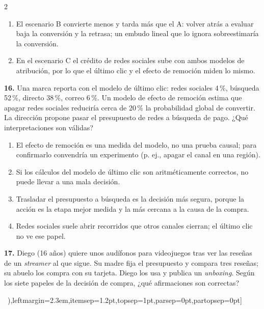 \documentclass[10pt,letterpaper]{article}
\newcommand{\cas}{\framebox[1.0em]{\rule{0pt}{1.05ex}}}
\begin{document}
\begin{multicols}{2}
\begin{minipage}[t]{\columnwidth}
\begin{enumerate}[label=\cas\ \alph*),leftmargin=2.3em,itemsep=1.2pt,topsep=1pt,parsep=0pt,partopsep=0pt]
\item El escenario B convierte menos y tarda más que el A: volver atrás a evaluar baja la conversión y la retrasa; un embudo lineal que lo ignora sobreestimaría la conversión.
\item En el escenario C el crédito de redes sociales sube con ambos modelos de atribución, por lo que el último clic y el efecto de remoción miden lo mismo.
\end{enumerate}\end{minipage}\par\vspace{3pt}
\begin{minipage}[t]{\columnwidth}\noindent\textbf{16.} Una marca reporta con el modelo de último clic: redes sociales 4\,\%, búsqueda 52\,\%, directo 38\,\%, correo 6\,\%. Un modelo de efecto de remoción estima que apagar redes sociales reduciría cerca de 20\,\% la probabilidad global de convertir. La dirección propone pasar el presupuesto de redes a búsqueda de pago. ¿Qué interpretaciones son válidas?
\vspace{1pt}\begin{enumerate}[label=\cas\ \alph*),leftmargin=2.3em,itemsep=1.2pt,topsep=1pt,parsep=0pt,partopsep=0pt]
\item El efecto de remoción es una medida del modelo, no una prueba causal; para confirmarlo convendría un experimento (p. ej., apagar el canal en una región).
\item Si los cálculos del modelo de último clic son aritméticamente correctos, no puede llevar a una mala decisión.
\item Trasladar el presupuesto a búsqueda es la decisión más segura, porque la acción es la etapa mejor medida y la más cercana a la causa de la compra.
\item Redes sociales suele abrir recorridos que otros canales cierran; el último clic no ve ese papel.
\end{enumerate}\end{minipage}\par\vspace{3pt}
\begin{minipage}[t]{\columnwidth}\noindent\textbf{17.} Diego (16 años) quiere unos audífonos para videojuegos tras ver las reseñas de un \textit{streamer} al que sigue. Su madre fija el presupuesto y compara tres reseñas; su abuelo los compra con su tarjeta. Diego los usa y publica un \textit{unboxing}. Según los siete papeles de la decisión de compra, ¿qué afirmaciones son correctas?
\vspace{1pt}\begin{enumerate}[label=\cas\ \alph*),leftmargin=2.3em,itemsep=1.2pt,topsep=1pt,parsep=0pt,partopsep=0pt]

\end{enumerate}
\end{minipage}
\end{multicols}
\end{document}
